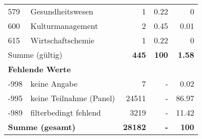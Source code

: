 \begin{longtable}{lXrrr}
        579 & \multicolumn{1}{X}{Gesundheitswesen} & %
          \num{1} &
          \num[round-mode=places,round-precision=2]{0,22} &
          \num[round-mode=places,round-precision=2]{0} \\

        600 & \multicolumn{1}{X}{Kulturmanagement} & %
          \num{2} &
          \num[round-mode=places,round-precision=2]{0,45} &
          \num[round-mode=places,round-precision=2]{0,01} \\

        615 & \multicolumn{1}{X}{Wirtschaftschemie} & %
          \num{1} &
          \num[round-mode=places,round-precision=2]{0,22} &
          \num[round-mode=places,round-precision=2]{0} \\

     \midrule
     \multicolumn{2}{l}{Summe (gültig)} &
       \textbf{\num{445}} &
     \textbf{100} &
       \textbf{\num[round-mode=places,round-precision=2]{1,58}} \\
     \multicolumn{5}{l}{\textbf{Fehlende Werte}}\\
       -998 &
       keine Angabe &
         \num{7} &
        - &
         \num[round-mode=places,round-precision=2]{0,02} \\
       -995 &
       keine Teilnahme (Panel) &
         \num{24511} &
        - &
         \num[round-mode=places,round-precision=2]{86,97} \\
       -989 &
       filterbedingt fehlend &
         \num{3219} &
        - &
         \num[round-mode=places,round-precision=2]{11,42} \\
     \midrule
     \multicolumn{2}{l}{\textbf{Summe (gesamt)}} &
          \textbf{\num{28182}} &
        \textbf{-} &
        \textbf{100} \\
     \bottomrule
     \end{longtable}
     
